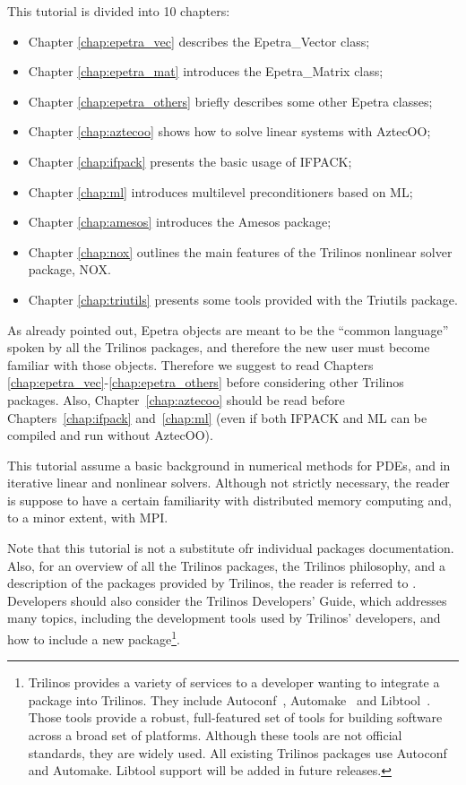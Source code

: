 This tutorial is divided into 10 chapters:
\begin{itemize}
\item Chapter \ref{chap:epetra_vec} describes the Epetra\_Vector class;
\item Chapter \ref{chap:epetra_mat} introduces the Epetra\_Matrix
  class; 
\item Chapter \ref{chap:epetra_others} briefly describes some other
  Epetra classes;
\item Chapter \ref{chap:aztecoo} shows how to solve linear systems with
  AztecOO;
\item Chapter \ref{chap:ifpack} presents the basic usage of IFPACK;
\item Chapter \ref{chap:ml} introduces multilevel preconditioners based
  on ML;
\item Chapter \ref{chap:amesos} introduces the Amesos package;
\item Chapter \ref{chap:nox} outlines the main features of the Trilinos
  nonlinear solver package, NOX.
\item Chapter \ref{chap:triutils} presents some tools provided with the
  Triutils package. 
\end{itemize}

\begin{remark}
  As already pointed out, Epetra objects are meant to be the ``common
  language'' spoken by all the Trilinos packages, and therefore the new
  user must become familiar with those objects. Therefore we suggest to
  read Chapters \ref{chap:epetra_vec}-\ref{chap:epetra_others} before
  considering other Trilinos packages. Also, Chapter~\ref{chap:aztecoo}
  should be read before Chapters~\ref{chap:ifpack} and~\ref{chap:ml}
  (even if both IFPACK and ML can be compiled and run without AztecOO).
\end{remark}

This tutorial assume a basic background in numerical methods for PDEs,
and in iterative linear and nonlinear solvers. Although not strictly
necessary, the reader is suppose to have a certain familiarity with
distributed memory computing and, to a minor extent, with MPI.

\smallskip

Note that this tutorial is not a substitute ofr individual packages
documentation. Also, for an overview of all the Trilinos packages, the
Trilinos philosophy, and a description of the packages provided by
Trilinos, the reader is referred to \cite{Trilinos-Overview}.
Developers should also consider the Trilinos Developers' Guide, which
addresses many topics, including the development tools used by Trilinos'
developers, and how to include a new package\footnote{ Trilinos provides
  a variety of services to a developer wanting to integrate a package
  into Trilinos.  They include Autoconf~\cite{Autoconf},
  Automake~\cite{Automake} and Libtool~\cite{Libtool}. Those tools
  provide a robust, full-featured set of tools for building software
  across a broad set of platforms.  Although these tools are not
  official standards, they are widely used.  All existing Trilinos
  packages use Autoconf and Automake.  Libtool support will be added in
  future releases.}.

